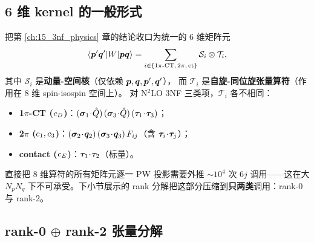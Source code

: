 \subsection{6 维 kernel 的一般形式}
\label{subsec:ch16-6d-kernel}

把第 \cref{ch:15_3nf_physics} 章的结论收口为统一的 6 维矩阵元
\begin{equation}
\label{eq:ch16-6D-kernel}
\langle \bm{p}'\bm{q}'|W|\bm{p}\bm{q}\rangle
= \sum_{i\in\{1\pi\text{-CT},\,2\pi,\,\rm ct\}} \mathcal{S}_i \otimes \mathcal{T}_i,
\end{equation}
其中 \(\mathcal{S}_i\) 是\textbf{动量-空间核}（仅依赖 \(\bm{p},\bm{q},\bm{p}',\bm{q}'\)），
而 \(\mathcal{T}_i\) 是\textbf{自旋-同位旋张量算符}（作用在 8 维 spin-isospin 空间上）。
对 N\(^2\)LO 3NF 三类项，\(\mathcal{T}_i\) 各不相同：

\begin{itemize}
  \item \textbf{1\(\pi\)-CT (\(c_D\))}：\((\bm{\sigma}_1\!\cdot\!\hat{Q})\,(\bm{\sigma}_3\!\cdot\!\hat{Q})\,(\bm{\tau}_1\!\cdot\!\bm{\tau}_3)\)；
  \item \textbf{2\(\pi\) (\(c_1, c_3\))}：\((\bm{\sigma}_2\!\cdot\!\bm{q}_2)\,(\bm{\sigma}_3\!\cdot\!\bm{q}_3)\,F_{ij}\)（含 \(\bm{\tau}_i\!\cdot\!\bm{\tau}_j\)）；
  \item \textbf{contact (\(c_E\))}：\(\bm{\tau}_1\!\cdot\!\bm{\tau}_2\)（标量）。
\end{itemize}

直接把 8 维算符的所有矩阵元逐一 PW 投影需要外推 \(\sim\!10^4\) 次 6\(j\) 调用——这在大 \(N_p N_q\)
下不可承受。下小节展示的 rank 分解把这部分压缩到\textbf{只两类}调用：rank-0 与 rank-2。

\subsection{rank-0 \(\oplus\) rank-2 张量分解}
\label{subsec:ch16-rank-decomp}

